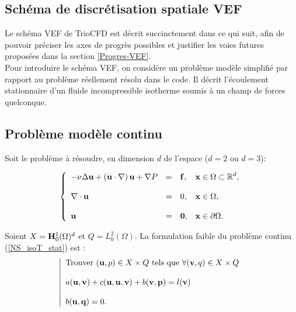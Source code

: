 
\begin{appendix}

\section{Sch\'ema de discr\'etisation spatiale VEF}
\label{section-VEF}

Le sch\'ema VEF de TrioCFD est d\'ecrit succinctement dans ce qui suit, afin de pouvoir pr\'eciser les axes de progr\`es possibles et
justifier les voies futures propos\'ees dans la section \ref{Progres-VEF}.\\

Pour introduire le sch\'ema VEF, on consid\'ere un probl\`eme mod\`ele simplifi\'e par rapport au probl\`eme r\'eellement r\'esolu dans le code.
Il d\'ecrit l'\'ecoulement stationnaire d'un fluide incompressible isotherme soumis \`a un champ de forces quelconque.

\subsection{Probl\`eme mod\`ele continu}
 
 Soit le probl\`eme \`a r\'esoudre, en dimension $d$ de l'espace ($d=2$ ou $d=3$): 

\begin{equation}
\label{NS_isoT_stat}
\left\lbrace
\begin{array}{lcll}
%
\ds{- \nu \Delta  \mathbf{u} + \left( \mathbf{u}\cdot \nabla \right) \mbf{u}+\nabla P }
&=&
\ds{ \mathbf{f},}
&\ds{ \mbf{x}\in \Omega\subset \mathbb R^d,}\\
\\
\ds{\nabla\cdot\mathbf{u}}
&=&
0,
&\ds{ \mbf{x}\in \Omega},\\
\\
\ds{ \mbf{u}}
&=&
\mbf{0},
&\ds{ \mbf{x}\in  \partial \Omega}.
\end{array}
\right.
\end{equation}


Soient $X=\mbf{H}^1_0(\Omega )^d$ et $Q=L_0^2 (\Omega )$. 
La formulation faible du probl\`eme continu (\ref{NS_isoT_stat}) est : \\

\begin{equation}
\label{Stokes_form_continu}
\left\lvert
\begin{array}{l}
\ds{ \text{Trouver } (\mbf{u},p)\in X\times Q  \text{ tels que } \forall (\mbf{v},q)\in X\times Q }\\
\\
\ds{a(\mbf{u}, \mbf{v})+c(\mbf{u}, \mbf{u}, \mbf{v}) + b( \mbf{v}, \mbf{p})=l(\mbf{v}) }\\
\\
\ds{b(\mbf{u},\mbf{q}) =0.}
\end{array}
\right.
\end{equation}


\end{appendix}

